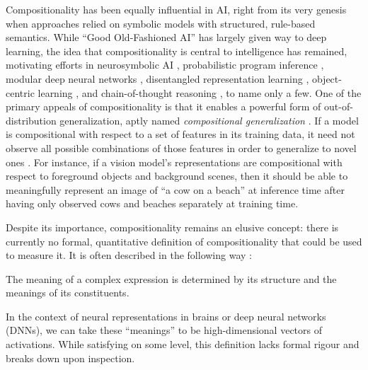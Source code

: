 \documentclass{article} %
\begin{document}
Compositionality has been equally influential in AI, right from its very genesis when approaches relied on symbolic models with structured, rule-based semantics. While ``Good Old-Fashioned AI'' has largely given way to deep learning, the idea that compositionality is central to intelligence has remained, motivating efforts in neurosymbolic AI \citep{garcez2023neurosymbolic,sheth2023neurosymbolic,marcus2003algebraic}, probabilistic program inference \citep{lake2017building,ellis2003dreamcoder}, modular deep neural networks \citet{bengio2017consciousness,goyal2022inductive,pfeiffer2023modular,andreas2016neural,alias2021neural,goyal2020object,schug2024discovering}, disentangled representation learning \citep{higgins2017betavae,lachapelle2022disentanglement,ahuja2022weakly,brehmer2022weakly,lippe2022citris,sawada2018disentangling}, object-centric learning \citep{locatello2020object,singh2023neural,wu2024neural}, and chain-of-thought reasoning \citep{wei2022chain,kojima2022large,hu2024amortizing}, to name only a few. One of the primary appeals of compositionality is that it enables a powerful form of out-of-distribution generalization, aptly named \textit{compositional generalization} \citep{lake2018generalization}. If a model is compositional with respect to a set of features in its training data, it need not observe all possible combinations of those features in order to generalize to novel ones \citep{schug2024discovering,wiedemer2024provable,wiedemer2023compositional,bahdanau2018systematic,mittal2021compositional}. For instance, if a vision model's representations are compositional with respect to foreground objects and background scenes, then it should be able to meaningfully represent an image of ``a cow on a beach'' at inference time after having only observed cows and beaches separately at training time.

Despite its importance, compositionality remains an elusive concept: there is currently no formal, quantitative definition of compositionality that could be used to measure it. It is often described in the following way \citep{sep-compositionality}:

\begin{definition}
    \label{def:compositionality_colloquial}
    The meaning of a complex expression is determined by its structure and the meanings of its constituents.
\end{definition}

In the context of neural representations in brains or deep neural networks (DNNs), we can take these ``meanings'' to be high-dimensional vectors of activations. While satisfying on some level, this definition lacks formal rigour and breaks down upon inspection.
\end{document}
